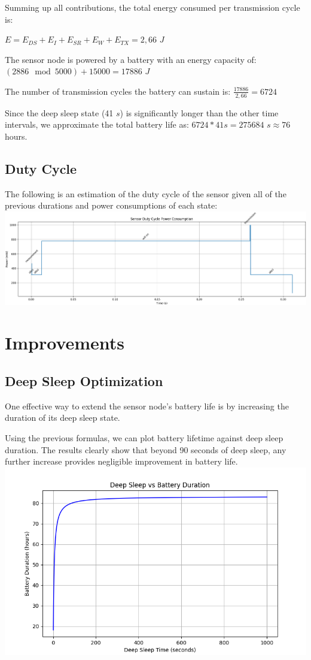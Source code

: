 \documentclass{Configuration_Files/PoliMi3i_thesis}
\begin{document}
Summing up all contributions, the total energy consumed per transmission cycle is:

$E = E_{DS}+E_{I}+E_{SR}+E_{W}+E_{TX}=2,66$ $J$

The sensor node is powered by a battery with an energy capacity of: \\ $(2886\mod 5000)+15000=17886$ $J$

The number of transmission cycles the battery can sustain is: $\frac{17886}{2,66}=6724$

Since the deep sleep state (41 $s$) is significantly longer than the other time intervals, we approximate the total battery life as: $6724*41s=275684$ $s\approx 76$ hours.

\section{Duty Cycle}
The following is an estimation of the duty cycle of the sensor given all of the previous durations and power consumptions of each state:\\
\includegraphics[width=\textwidth]{Images/duty_cycle.png}

\chapter{Improvements}
\label{ch:improvements}%

\section{Deep Sleep Optimization}
One effective way to extend the sensor node’s battery life is by increasing the duration of its deep sleep state. 

Using the previous formulas, we can plot battery lifetime against deep sleep duration. The results clearly show that beyond 90 seconds of deep sleep, any further increase provides negligible improvement in battery life.\\
\includegraphics[width=\textwidth]{Images/deep sleep hours.png}
\end{document}
